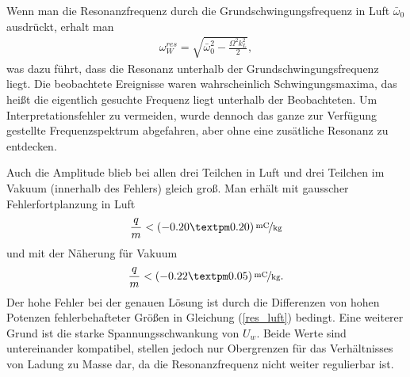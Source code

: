 \documentclass[a4paper,12pt]{article}
\begin{document}
Wenn man die Resonanzfrequenz durch die Grundschwingungsfrequenz in Luft $\bar{ω}_0$ ausdrückt, erhalt man
\begin{align*}
	ω^{res}_W = \sqrt{ \bar{ω}_0^2 - \frac{Ω^2k_L^2}{2} },
\end{align*}
was dazu führt, dass die Resonanz unterhalb der Grundschwingungsfrequenz liegt.
Die beobachtete Ereignisse waren wahrscheinlich Schwingungsmaxima, das heißt die eigentlich gesuchte Frequenz liegt unterhalb der Beobachteten.
Um Interpretationsfehler zu vermeiden, wurde dennoch das ganze zur Verfügung gestellte Frequenzspektrum abgefahren, aber ohne eine zusätliche Resonanz zu entdecken.

Auch die Amplitude blieb bei allen drei Teilchen in Luft und drei Teilchen im Vakuum (innerhalb des Fehlers) gleich groß.
Man erhält mit gausscher Fehlerfortplanzung in Luft
$$\frac{q}{m} < \unitfrac[( -0.20 ± 0.20 )]{mC}{kg}$$
und mit der Näherung für Vakuum
$$\frac{q}{m} < \unitfrac[( -0.22 ± 0.05 ) ]{mC}{kg}.$$
Der hohe Fehler bei der genauen Lösung ist durch die Differenzen von hohen Potenzen fehlerbehafteter Größen in Gleichung (\ref{res_luft}) bedingt.
Eine weiterer Grund ist die starke Spannungsschwankung von  $U_w$.
Beide Werte sind untereinander kompatibel, stellen jedoch nur Obergrenzen für das Verhältnisses von Ladung zu Masse dar, da die Resonanzfrequenz nicht weiter regulierbar ist.

\end{document}
